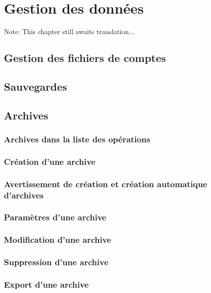 
\chapter{Gestion des données\label{datamanagement}}

Note: This chapter still awaits translation...

\section{Gestion des fichiers de comptes\label{datamanagement-files}}


\section{Sauvegardes\label{datamanagement-backup}}


\section{Archives\label{datamanagement-history}}


\subsection{Archives dans la liste des opérations\label{datamanagement-history-list}}



\subsection{Création d'une archive\label{datamanagement-history-new}}


\subsection{Avertissement de création et création automatique d'archives\label{datamanagement-history-auto}}


\subsection{Paramètres d'une archive\label{datamanagement-history-parameters}}


\subsection{Modification d'une archive\label{datamanagement-history-modify}}


\subsection{Suppression d'une archive\label{datamanagement-history-remove}}

\subsection{Export d'une archive\label{datamanagement-history-export}}










